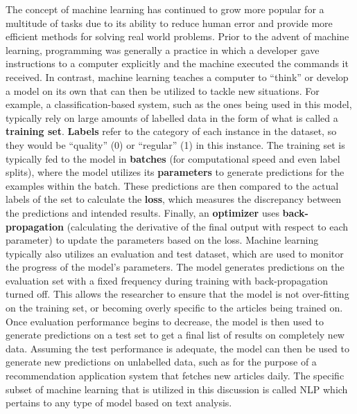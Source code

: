 The concept of machine learning has continued to grow more popular for a multitude of tasks due to its ability to reduce human error and provide more efficient methods for solving real world problems. Prior to the advent of machine learning, programming was generally a practice in which a developer gave instructions to a computer explicitly and the machine executed the commands it received. In contrast, machine learning teaches a computer to “think” or develop a model on its own that can then be utilized to tackle new situations. For example, a classification-based system, such as the ones being used in this model, typically rely on large amounts of labelled data in the form of what is called a \textbf{training set}. \textbf{Labels} refer to the category of each instance in the dataset, so they would be “quality” (0) or “regular” (1) in this instance. The training set is typically fed to the model in \textbf{batches} (for computational speed and even label splits), where the model utilizes its \textbf{parameters} to generate predictions for the examples within the batch. These predictions are then compared to the actual labels of the set to calculate the \textbf{loss}, which measures the discrepancy between the predictions and intended results. Finally, an \textbf{optimizer} uses \textbf{back-propagation} (calculating the derivative of the final output with respect to each parameter) to update the parameters based on the loss. Machine learning typically also utilizes an evaluation and test dataset, which are used to monitor the progress of the model’s parameters. The model generates predictions on the evaluation set with a fixed frequency during training with back-propagation turned off. This allows the researcher to ensure that the model is not over-fitting on the training set, or becoming overly specific to the articles being trained on. Once evaluation performance begins to decrease, the model is then used to generate predictions on a test set to get a final list of results on completely new data. Assuming the test performance is adequate, the model can then be used to generate new predictions on unlabelled data, such as for the purpose of a recommendation application system that fetches new articles daily. The specific subset of machine learning that is utilized in this discussion is called \gls{NLP} which pertains to any type of model based on text analysis.